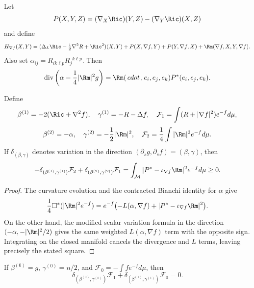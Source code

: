 \begin{definition}
\label{def:chow-iii-ch17-matrix-harnack-curvature-square}
Let
\[
 P(X,Y,Z)=(\nabla_X\Ric)(Y,Z)-(\nabla_Y\Ric)(X,Z)
\]
and define
\[
 H_{\nabla f}(X,Y)=
 (\Delta_L\Ric-\tfrac12\nabla^2R+\Ric^2)(X,Y)
 +P(X,\nabla f,Y)+P(Y,\nabla f,X)
 +\Rm(\nabla f,X,Y,\nabla f).
\]
Also set $\alpha_{ij}=R_{ik\ell p}R_j{}^{k\ell p}$.  Then
\[
 \operatorname{div}\left(\alpha-\frac14|\Rm|^2g\right)
 =\Rm(\,cdot\,,e_i,e_j,e_k)P^*(e_i,e_j,e_k).
\]
\end{definition}

\begin{theorem}
\label{thm:chow-iii-ch17-coupled-loop-variation}
Define
\[
 \beta^{(1)}=-2(\Ric+\nabla^2f),\quad \gamma^{(1)}=-R-\Delta f,
 \quad \mathcal F_1=\int(R+|\nabla f|^2)e^{-f}d\mu,
\]
\[
 \beta^{(2)}=-\alpha,\quad \gamma^{(2)}=-\frac12|\Rm|^2,
 \quad \mathcal F_2=\frac14\int|\Rm|^2e^{-f}d\mu.
\]
If $\delta_{(\beta,\gamma)}$ denotes variation in the direction
$(\partial_sg,\partial_sf)=(\beta,\gamma)$, then
\[
 -\delta_{(\beta^{(1)},\gamma^{(1)})}\mathcal F_2
 +\delta_{(\beta^{(2)},\gamma^{(2)})}\mathcal F_1
 =\int_{\mathcal M}|P^*-\iota_{\nabla f}\Rm|^2e^{-f}d\mu\ge0.
\]
\end{theorem}
\begin{proof}
\sketch The curvature evolution and the contracted Bianchi identity for $\alpha$
give
\[
 \frac14\Box^*(|\Rm|^2e^{-f})
 =e^{-f}\bigl(-L(\alpha,\nabla f)
 +|P^*-\iota_{\nabla f}\Rm|^2\bigr).
\]
On the other hand, the modified-scalar variation formula in the direction
$(-\alpha,-|\Rm|^2/2)$ gives the same weighted
$L(\alpha,\nabla f)$ term with the opposite sign.  Integrating on the closed
manifold cancels the divergence and $L$ terms, leaving precisely the stated
square.
\end{proof}

\begin{remark}
\label{rem:chow-iii-ch17-zeroth-loop-variation}
If $\beta^{(0)}=g$, $\gamma^{(0)}=n/2$, and
$\mathcal F_0=-\int f e^{-f}d\mu$, then
\[
 \delta_{(\beta^{(0)},\gamma^{(0)})}\mathcal F_1
 +\delta_{(\beta^{(1)},\gamma^{(1)})}\mathcal F_0=0.
\]
\end{remark}
